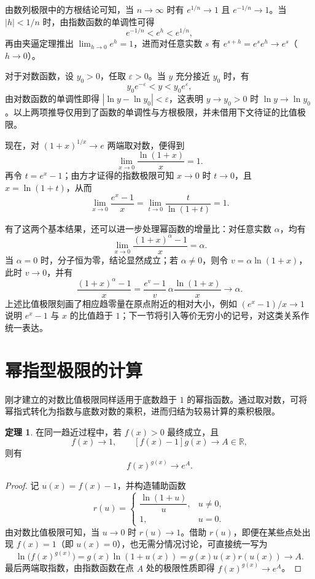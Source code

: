\documentclass[UTF8,fontset=fandol,a4paper,12pt]{ctexart}
\newcommand{\R}{\mathbb R}
\theoremstyle{definition}
\newtheorem*{theorem}{定理}
\begin{document}
由数列极限中的方根结论可知，当 $n\to\infty$ 时有 $e^{1/n}\to1$ 且 $e^{-1/n}\to1$。当 $|h|<1/n$ 时，由指数函数的单调性可得
\[
 e^{-1/n}<e^h<e^{1/n},
\]
再由夹逼定理推出 $\lim_{h\to0}e^h=1$，进而对任意实数 $s$ 有 $e^{s+h}=e^s e^h\to e^s$（$h\to0$）。

对于对数函数，设 $y_0>0$，任取 $\varepsilon>0$。当 $y$ 充分接近 $y_0$ 时，有
\[
 y_0e^{-\varepsilon}<y<y_0e^{\varepsilon},
\]
由对数函数的单调性即得 $|\ln y-\ln y_0|<\varepsilon$，这表明 $y\to y_0>0$ 时 $\ln y\to\ln y_0$。以上两项推导仅用到了函数的单调性与方根极限，并未借用下文待证的比值极限。

现在，对 $(1+x)^{1/x}\to e$ 两端取对数，便得到
\[
 \boxed{\lim_{x\to0}\frac{\ln(1+x)}x=1.}
\]
再令 $t=e^x-1$；由方才证得的指数极限可知 $x\to0$ 时 $t\to0$，且 $x=\ln(1+t)$，从而
\[
 \boxed{\lim_{x\to0}\frac{e^x-1}{x}
 =\lim_{t\to0}\frac{t}{\ln(1+t)}=1.}
\]

有了这两个基本结果，还可以进一步处理幂函数的增量比：对任意实数 $\alpha$，均有
\[
 \lim_{x\to0}\frac{(1+x)^\alpha-1}{x}=\alpha.
\]
当 $\alpha=0$ 时，分子恒为零，结论显然成立；若 $\alpha\ne0$，则令 $v=\alpha\ln(1+x)$，此时 $v\to0$，并有
\[
 \frac{(1+x)^\alpha-1}{x}
 =\frac{e^v-1}{v}\,\alpha\frac{\ln(1+x)}x\to\alpha.
\]
上述比值极限刻画了相应趋零量在原点附近的相对大小，例如 $(e^x-1)/x\to1$ 说明 $e^x-1$ 与 $x$ 的比值趋于 $1$；下一节将引入等价无穷小的记号，对这类关系作统一表达。

\section{幂指型极限的计算}
刚才建立的对数比值极限同样适用于底数趋于 $1$ 的幂指函数。通过取对数，可将幂指式转化为指数与底数对数的乘积，进而归结为较易计算的乘积极限。

\begin{theorem}
在同一趋近过程中，若 $f(x)>0$ 最终成立，且
\[
 f(x)\to1,\qquad [f(x)-1]g(x)\to A\in\R,
\]
则有
\[
 f(x)^{g(x)}\to e^A.
\]
\end{theorem}
\begin{proof}
记 $u(x)=f(x)-1$，并构造辅助函数
\[
 r(u)=\begin{cases}\dfrac{\ln(1+u)}u,&u\ne0,\\[0.4em]1,&u=0.\end{cases}
\]
由对数比值极限可知，当 $u\to0$ 时 $r(u)\to1$。借助 $r(u)$，即便在某些点处出现 $f(x)=1$（即 $u(x)=0$），也无需分情况讨论，可直接统一写为
\[
 \ln\bigl(f(x)^{g(x)}\bigr)
 =g(x)\ln(1+u(x))
 =g(x)u(x)r(u(x))\to A.
\]
最后两端取指数，由指数函数在点 $A$ 处的极限性质即得 $f(x)^{g(x)}\to e^A$。
\end{proof}
\end{document}
